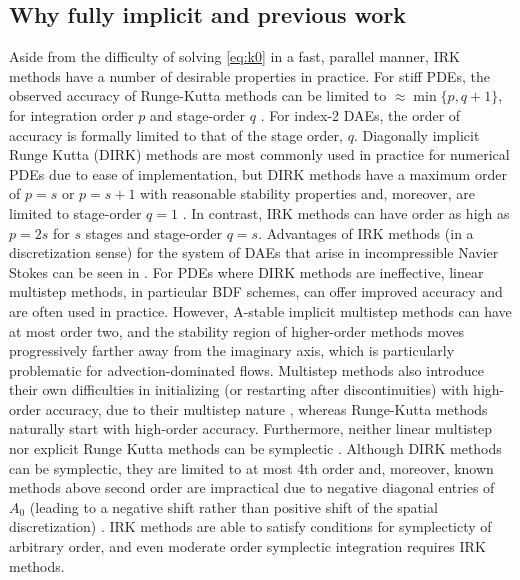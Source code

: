 \documentclass[review]{siamart}
\begin{document}
\subsection{Why fully implicit and previous work}\label{sec:intro:hist}

Aside from the difficulty of solving \eqref{eq:k0} in a fast, parallel manner,
IRK methods have a number of desirable properties in practice. For stiff PDEs,
the observed accuracy of Runge-Kutta methods can be limited to $\approx \min\{
p, q+1\}$, for integration order $p$ and stage-order $q$
\cite{hairer96,kennedy16}. For index-2 DAEs, the order of accuracy is formally
limited to that of the stage order, $q$. Diagonally implicit Runge Kutta (DIRK)
methods are most commonly used in practice for numerical PDEs due to ease of
implementation, but DIRK methods have a maximum order of $p=s$ or $p=s+1$ with
reasonable stability properties \cite[Section IV.6]{hairer96} and, moreover, are
limited to stage-order $q=1$ \cite{kennedy16}. In contrast, IRK methods can have
order as high as $p=2s$ for $s$ stages and stage-order $q =
s$. Advantages of IRK methods (in a discretization sense) for
the system of DAEs that arise in incompressible Navier Stokes can be seen in
\cite{Sanderse.2013}. For PDEs where DIRK methods are ineffective, linear
multistep methods, in particular BDF schemes, can offer improved accuracy and
are often used in practice. However, A-stable implicit multistep methods can
have at most order two, and the stability region of higher-order methods moves
progressively farther away from the imaginary axis, which is particularly
problematic for advection-dominated flows. Multistep methods also introduce
their own difficulties in initializing (or restarting after discontinuities)
with high-order accuracy, due to their multistep nature \cite[Chapter
4]{brenan1995numerical}, whereas Runge-Kutta methods naturally start with
high-order accuracy. Furthermore, neither linear multistep nor explicit
Runge Kutta methods can be symplectic \cite{Hairer.2002}. Although DIRK methods
can be symplectic, they are limited to at most 4th order and, moreover, known
methods above second order are impractical due to negative diagonal entries
of $A_0$ (leading to a negative shift rather than positive shift of the spatial
discretization) \cite{kennedy16}. IRK methods are able to satisfy conditions
for symplecticty of arbitrary order, and even moderate order symplectic
integration requires IRK methods.
\end{document}
